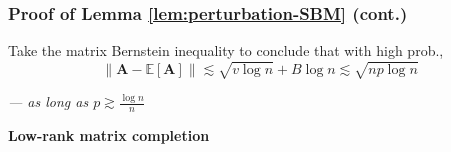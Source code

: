 \documentclass[compress,
mathserif,wide,%
]{beamer}
\begin{document}
\begin{frame}
	\frametitle{Proof of Lemma \ref{lem:perturbation-SBM} (cont.)}
		
Take the matrix Bernstein inequality to conclude that with high prob.,
%
\begin{equation*}
	\|\bm{A}-\mathbb{E}[\bm{A}]\|\lesssim\sqrt{v\log n}+B\log n\lesssim \sqrt{np\log n} 
\end{equation*}

{\hfill \em --- as long as $p \gtrsim \frac{\log n}{n}$}
\end{frame}



\begin{frame}[plain]
	\vfill
	\centering
	\large \bf Low-rank matrix completion
	\vfill
\end{frame}
\end{document}
